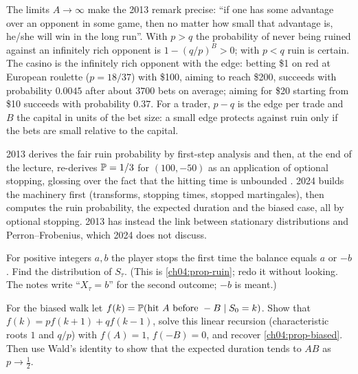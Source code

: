 \begin{paracol}{2}
\begin{finance}
The limits $A\to\infty$ make the 2013 remark precise: ``if one has some advantage over an opponent in some game, then no
matter how small that advantage is, he/she will win in the long run''. With $p>q$ the probability of never being ruined
against an infinitely rich opponent is $1-(q/p)^B>0$; with $p<q$ ruin is certain. The casino is the infinitely rich
opponent with the edge: betting \$1 on red at European roulette ($p=18/37$) with \$100, aiming to reach \$200, succeeds
with probability $0.0045$ after about $3700$ bets on average; aiming for \$20 starting from \$10 succeeds with probability
$0.37$. For a trader, $p-q$ is the edge per trade and $B$ the capital in units of the bet size: a small edge protects
against ruin only if the bets are small relative to the capital.
\end{finance}

\begin{coursenote}
2013 derives the fair ruin probability by first-step analysis and then, at the end of the lecture, re-derives
$\mathbb{P}=1/3$ for $(100,-50)$ as an application of optional stopping, glossing over the fact that the hitting time is
unbounded . 2024 builds the machinery first (transforms, stopping times, stopped martingales), then
computes the ruin probability, the expected duration and the biased case, all by optional stopping. 2013 has instead
the link between stationary distributions and Perron--Frobenius, which 2024 does not discuss.
\end{coursenote}

\begin{exercise}
For positive integers $a,b$ the player stops the first time the balance equals $a$ or $-b$. Find the distribution of
$S_\tau$. (This is \cref{ch04:prop-ruin}; redo it without looking. The notes write ``$X_\tau=b$'' for the second
outcome; $-b$ is meant.)
\end{exercise}

\begin{exercise}
For the biased walk let $f(k)=\mathbb{P}(\text{hit }A\text{ before }-B\mid S_0=k)$. Show that
$f(k)=pf(k+1)+qf(k-1)$, solve this linear recursion (characteristic roots $1$ and $q/p$) with $f(A)=1$, $f(-B)=0$, and
recover \cref{ch04:prop-biased}. Then use Wald's identity to show that the expected duration tends to $AB$ as
$p\to\frac12$.
\end{exercise}


\end{paracol}
